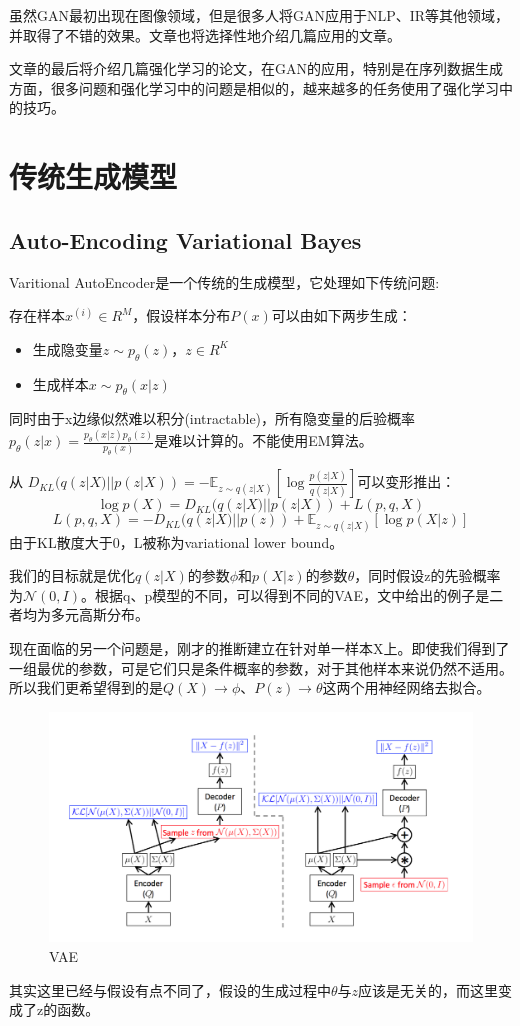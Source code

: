 \documentclass[a4paper]{article}
\begin{document}
虽然GAN最初出现在图像领域，但是很多人将GAN应用于NLP、IR等其他领域，并取得了不错的效果。文章也将选择性地介绍几篇应用的文章。

文章的最后将介绍几篇强化学习的论文，在GAN的应用，特别是在序列数据生成方面，很多问题和强化学习中的问题是相似的，越来越多的任务使用了强化学习中的技巧。
\section{传统生成模型}
\subsection{Auto-Encoding Variational Bayes\cite{vae}}
Varitional AutoEncoder是一个传统的生成模型，它处理如下传统问题:

存在样本${x^{(i)}\in R^M}$，假设样本分布$P(x)$可以由如下两步生成：
\begin{itemize}

\item 生成隐变量$z\sim p_\theta(z)$，$z\in R^K$
\item 生成样本$x \sim p_\theta(x|z)$
\end{itemize}
同时由于x边缘似然难以积分(intractable)，所有隐变量的后验概率$p_{\theta}(z|x) = \frac{p_\theta(x|z)p_\theta(z)}{p_\theta(x)}$是难以计算的。不能使用EM算法。

从
$D_{KL}(q(z|X)||p(z|X))=-\mathbb{E}_{z\sim q(z|X)}[\log\frac{p(z|X)}{q(z|X)}]$可以变形推出：
$$\log p(X)=D_{KL}(q(z|X)||p(z|X))+ L(p,q,X)$$
$$L(p,q,X)=-D_{KL}(q(z|X)||p(z))+\mathbb{E}_{z\sim q(z|X)}[\log p(X|z)]$$
由于KL散度大于0，L被称为variational lower bound。

我们的目标就是优化$q(z|X)$的参数$\phi$和$p(X|z)$的参数$\theta$，同时假设z的先验概率为$\mathcal{N}(0,I)$。根据q、p模型的不同，可以得到不同的VAE，文中给出的例子是二者均为多元高斯分布。

现在面临的另一个问题是，刚才的推断建立在针对单一样本X上。即使我们得到了一组最优的参数，可是它们只是条件概率的参数，对于其他样本来说仍然不适用。所以我们更希望得到的是$Q(X)\longrightarrow\phi、P(z) \longrightarrow \theta$这两个用神经网络去拟合。
\begin{figure}
\includegraphics[width=\textwidth]{./img/2.png}
\caption{VAE}
\label{fig:vae}
\end{figure}
其实这里已经与假设有点不同了，假设的生成过程中$\theta$与$z$应该是无关的，而这里变成了z的函数。
\end{document}
